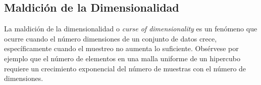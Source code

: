 \subsection{Maldición de la Dimensionalidad}
La maldición de la dimensionalidad o \textit{curse of dimensionality}
es un fenómeno que ocurre cuando el número dimensiones de un conjunto de datos crece,
específicamente cuando el muestreo no aumenta lo suficiente. Obsérvese por ejemplo que el
número de elementos en una malla uniforme de un hipercubo requiere un crecimiento exponencial del
número de muestras con el número de dimensiones.
